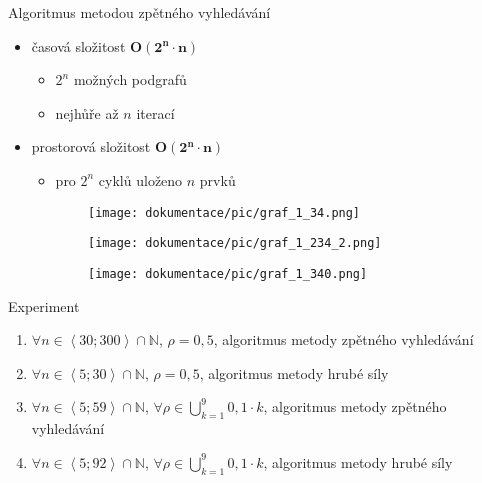 \documentclass[xcolor=dvipsnames,table,10pt]{beamer}
\begin{document}
\begin{frame}{Algoritmus metodou zp\v{e}tn\'eho vyhled\'av\'an\'i}
\begin{itemize}
        \item \v{c}asov\'a slo\v{z}itost $\mathbf{O(2^n\cdot n)}$
        \begin{itemize}
            \item $2^n$ mo\v{z}n\'ych podgraf\r{u}
            \item nejh\r{u}\v{r}e a\v{z} $n$ iterac\'i\\[10pt]
        \end{itemize}
        \item prostorov\'a slo\v{z}itost $\mathbf{O(2^n\cdot n)}$
        \begin{itemize}
            \item pro $2^n$ cykl\r{u} ulo\v{z}eno $n$ prvk\r{u}
        \end{itemize}
    \end{itemize}
    \hspace{15pt}
    \begin{figure}[h!]
        \centering
        \begin{subfigure}{0.3\textwidth}
            \texttt{[image: dokumentace/pic/graf\_1\_34.png]}
        \end{subfigure}
        \hfill
        \begin{subfigure}{0.3\textwidth}
            \texttt{[image: dokumentace/pic/graf\_1\_234\_2.png]}
        \end{subfigure}
        \hfill
        \begin{subfigure}{0.3\textwidth}
            \texttt{[image: dokumentace/pic/graf\_1\_340.png]}
        \end{subfigure}
    \end{figure}
    
\end{frame}


\begin{frame}{Experiment}
    \begin{enumerate}
        \item $\forall n \in \left<30;300\right> \cap \mathbb{N}$, $\rho = 0,5$, algoritmus metody zp\v{e}tn\'eho vyhled\'av\'an\'i\\[10pt]
        \item $\forall n \in \left<5;30\right> \cap \mathbb{N}$, $\rho = 0,5$, algoritmus metody hrub\'e s\'ily\\[10pt]
        \item $\forall n \in \left<5;59\right> \cap \mathbb{N}$, $\forall \rho \in \bigcup_{k=1}^{9}0,1\cdot k$, algoritmus metody zp\v{e}tn\'eho vyhled\'av\'an\'i\\[10pt]
        \item $\forall n \in \left<5;92\right> \cap \mathbb{N}$, $\forall \rho \in \bigcup_{k=1}^{9}0,1\cdot k$, algoritmus metody hrub\'e s\'ily
    \end{enumerate}    
\end{frame}
\end{document}
